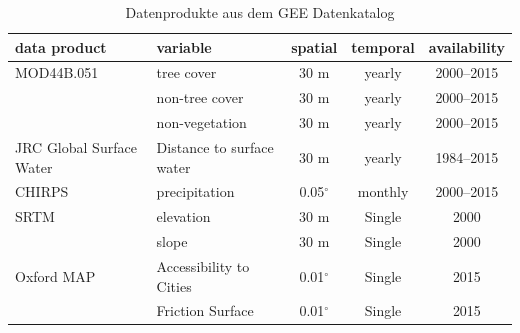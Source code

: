 \documentclass[11pt,twoside,a4paper,final]{report}
\begin{document}
\begin{table}[h]
\begin{tabularx}{\textwidth}{llccc}
\hline
\textbf{data product} & \textbf{variable} & \textbf{spatial} & \textbf{temporal} & \textbf{availability}\\
\hline

MOD44B.051 & tree cover  & 30 m & yearly & 2000–2015 \\

 & non-tree cover  & 30 m & yearly & 2000–2015 \\

 & non-vegetation  & 30 m & yearly & 2000–2015 \\

JRC Global Surface Water  & Distance to surface water & 30 m & yearly & 1984–2015 \\

CHIRPS & precipitation & 0.05$^\circ$ & monthly & 2000–2015\\

SRTM & elevation  & 30 m & Single & 2000\\
 & slope  & 30 m & Single & 2000\\

Oxford MAP & Accessibility to Cities  & 0.01$^\circ$ & Single & 2015\\

& Friction Surface  & 0.01$^\circ$  & Single & 2015\\

\hline
\end{tabularx}
\caption{Datenprodukte aus dem GEE Datenkatalog}
\end{table}
\end{document}
